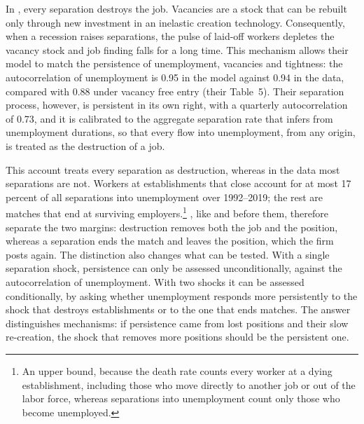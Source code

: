 \documentclass[authoryear, review, 12pt]{elsarticle}
\begin{document}
In \citet{coles_2018}, every separation destroys the job. Vacancies are a stock that can be rebuilt only through new investment in an inelastic creation technology. Consequently, when a recession raises separations, the pulse of laid-off workers depletes the vacancy stock and job finding falls for a long time. This mechanism allows their model to match the persistence of unemployment, vacancies and tightness: the autocorrelation of unemployment is 0.95 in the model against 0.94 in the data, compared with 0.88 under vacancy free entry (their Table~5). Their separation process, however, is persistent in its own right, with a quarterly autocorrelation of 0.73, and it is calibrated to the aggregate separation rate that \citet{shimer_2005} infers from unemployment durations, so that every flow into unemployment, from any origin, is treated as the destruction of a job.

This account treats every separation as destruction, whereas in the data most separations are not. Workers at establishments that close account for at most 17 percent of all separations into unemployment over 1992--2019; the rest are matches that end at surviving employers.\footnote{An upper bound, because the death rate counts every worker at a dying establishment, including those who move directly to another job or out of the labor force, whereas separations into unemployment count only those who become unemployed.}
\citet{gabrovski_2025}, like \citet{fujita_2007} and \citet{haefke_2020} before them, therefore separate the two margins: destruction removes both the job and the position, whereas a separation ends the match and leaves the position, which the firm posts again. The distinction also changes what can be tested. With a single separation shock, persistence can only be assessed unconditionally, against the autocorrelation of unemployment. With two shocks it can be assessed conditionally, by asking whether unemployment responds more persistently to the shock that destroys establishments or to the one that ends matches. The answer distinguishes mechanisms: if persistence came from lost positions and their slow re-creation, the shock that removes more positions should be the persistent one.
\end{document}
